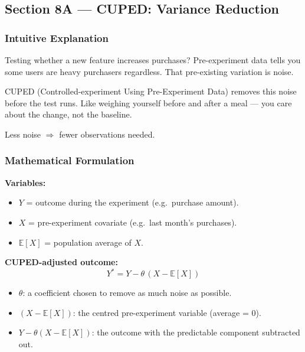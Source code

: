 \documentclass[12pt, a4paper]{article}
\newcommand{\E}{\mathbb{E}}            %
\begin{document}
\subsection{Section 8A --- CUPED: Variance Reduction}

\subsubsection*{Intuitive Explanation}

\begin{intuition}
Testing whether a new feature increases purchases?  Pre-experiment data tells
you some users are heavy purchasers regardless.  That pre-existing variation is
noise.

CUPED (Controlled-experiment Using Pre-Experiment Data) removes this noise
before the test runs.  Like weighing yourself before and after a meal --- you
care about the change, not the baseline.

Less noise $\Rightarrow$ fewer observations needed.
\end{intuition}

\subsubsection*{Mathematical Formulation}

\textbf{Variables:}
\begin{itemize}[nosep]
  \item $Y$ = outcome during the experiment (e.g.\ purchase amount).
  \item $X$ = pre-experiment covariate (e.g.\ last month's purchases).
  \item $\E[X]$ = population average of $X$.
\end{itemize}

\textbf{CUPED-adjusted outcome:}
\[
  \boxed{Y^{*} = Y - \theta\,(X - \E[X])}
\]

\begin{plainlanguage}
\begin{itemize}[nosep]
  \item $\theta$: a coefficient chosen to remove as much noise as possible.
  \item $(X - \E[X])$: the centred pre-experiment variable (average = 0).
  \item $Y - \theta(X - \E[X])$: the outcome with the predictable component
        subtracted out.
\end{itemize}
\end{plainlanguage}
\end{document}
